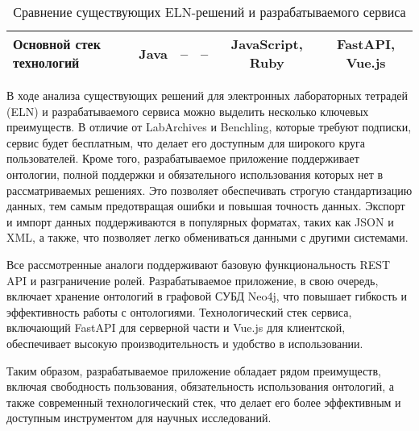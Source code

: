 \begin{table}[h]
{\begin{tabular}{|l|c|c|c|c|c|}
            \hline
            Основной стек технологий & \cellcolor{green!20}Java       & \cellcolor{red!20}--          & \cellcolor{red!20}--               & \cellcolor{green!20}JavaScript, Ruby & \cellcolor{green!20}FastAPI, Vue.js    \\
            \hline
        \end{tabular}
    }
    \caption{Сравнение существующих ELN-решений и разрабатываемого сервиса}
    \label{tab:comparison}
\end{table}


В ходе анализа существующих решений для электронных лабораторных тетрадей (ELN) и разрабатываемого сервиса можно выделить несколько ключевых преимуществ.
В отличие от LabArchives и Benchling, которые требуют подписки, сервис будет бесплатным, что делает его доступным для широкого круга пользователей.
Кроме того, разрабатываемое приложение поддерживает онтологии, полной поддержки и обязательного использования которых нет в рассматриваемых решениях.
Это позволяет обеспечивать строгую стандартизацию данных, тем самым предотвращая ошибки и повышая точность данных.
Экспорт и импорт данных поддерживаются в популярных форматах, таких как JSON и XML, а также, что позволяет легко обмениваться данными с другими системами.

Все рассмотренные аналоги поддерживают базовую функциональность REST API и разграничение ролей.
Разрабатываемое приложение, в свою очередь, включает хранение онтологий в графовой СУБД Neo4j, что повышает гибкость и эффективность работы с онтологиями.
Технологический стек сервиса, включающий FastAPI для серверной части и Vue.js для клиентской, обеспечивает высокую производительность и удобство в использовании.

Таким образом, разрабатываемое приложение обладает рядом преимуществ, включая свободность пользования, обязательность использования онтологий, а также современный технологический стек, что делает его более эффективным и доступным инструментом для научных исследований.